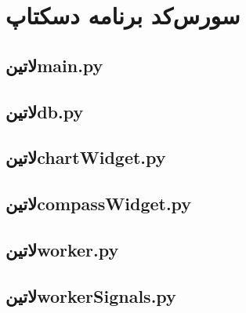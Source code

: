 \section*{سورس‌کد برنامه دسکتاپ}

\subsection*{‌لاتین{main.py}}
\begin{latin}
	
\end{latin}

\subsection*{‌لاتین{db.py}}
\begin{latin}
	
\end{latin}

\subsection*{‌لاتین{chartWidget.py}}
\begin{latin}
	
\end{latin}

\subsection*{‌لاتین{compassWidget.py}}
\begin{latin}
	
\end{latin}

\subsection*{‌لاتین{worker.py}}
\begin{latin}
	
\end{latin}

\subsection*{‌لاتین{workerSignals.py}}
\begin{latin}
	
\end{latin}

